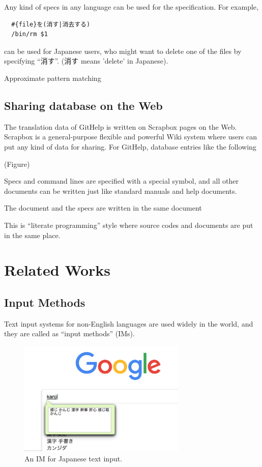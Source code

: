\documentclass{sigchi}
\def\GH{\textsf{GitHelp}}
\def\SB{\textsf{Scrapbox}}
\begin{document}
Any kind of specs in any language can be used for the specification.
For example,

\begin{verbatim}
  #{file}を(消す|消去する)
  /bin/rm $1
\end{verbatim}

can be  used for Japanese users, who might want to delete
one of the files by specifying ``消す''.
(消す means 'delete' in Japanese).


Approximate pattern matching


\subsection{Sharing database on the Web}

The translation data of {\GH} is written on {\SB} pages on the Web.
{\SB} is a general-purpose flexible and powerful Wiki system where
users can put any kind of data for sharing.
For {\GH}, database entries like the following

(Figure)

Specs and command lines are specified with a special symbol, and
all other documents can be written just like standard manuals and help documents.

The document and the specs are written in the same document

This is
``literate programming'' style where
source codes and documents are put in the same place.

\section{Related Works}

\subsection{Input Methods}

Text input systems for non-English languages are used widely in the world, and
they are called as ``input methods'' (IMs).

\begin{figure}[h]
  \includegraphics[width=8cm,bb=0 0 976 670]{figures/nyuuryoku-ime.png}
  \caption{An IM for Japanese text input.}
  \label{bash1}
\end{figure}
\end{document}
